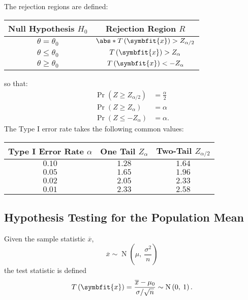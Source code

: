 \documentclass{article}
\begin{document}
The rejection regions are defined:
\begin{center}
    \begin{tabular}{cc}
        \toprule
        \textbf{Null Hypothesis} \(H_0\) & \textbf{Rejection Region} \(R\)                       \\
        \midrule
        \(\theta = \theta_0\)            & \(\abs*{T\left( \symbfit{x} \right)} > Z_{\alpha/2}\) \\
        \(\theta \leq \theta_0\)         & \(T\left( \symbfit{x} \right) > Z_{\alpha}\)          \\
        \(\theta \geq \theta_0\)         & \(T\left( \symbfit{x} \right) < -Z_{\alpha}\)         \\
        \bottomrule
    \end{tabular}
\end{center}
so that:
\begin{align*}
    \Pr{\left( Z \geq Z_{\alpha / 2} \right)} & = \frac{\alpha}{2} \\
    \Pr{\left( Z \geq Z_{\alpha} \right)}     & = \alpha           \\
    \Pr{\left( Z \leq -Z_{\alpha} \right)}    & = \alpha.
\end{align*}
The Type I error rate takes the following common values:
\begin{center}
    \begin{tabular}{ccc}
        \toprule
        \textbf{Type I Error Rate} \(\alpha\) & \textbf{One Tail} \(Z_{\alpha}\) & \textbf{Two-Tail} \(Z_{\alpha/2}\) \\
        \midrule
        \(0.10\)                              & \(1.28\)                         & \(1.64\)                           \\
        \(0.05\)                              & \(1.65\)                         & \(1.96\)                           \\
        \(0.02\)                              & \(2.05\)                         & \(2.33\)                           \\
        \(0.01\)                              & \(2.33\)                         & \(2.58\)                           \\
        \bottomrule
    \end{tabular}
\end{center}
\subsection{Hypothesis Testing for the Population Mean}
Given the sample statistic \(\overline{x}\),
\begin{equation*}
    \overline{x} \sim \operatorname{N}\left( \mu,\: \frac{\sigma^2}{n} \right)
\end{equation*}
the test statistic is defined
\begin{equation*}
    T\left( \symbfit{x} \right) = \frac{\overline{x} - \mu_0}{\sigma/\sqrt{n}} \sim \operatorname{N}\left( 0,\: 1 \right).
\end{equation*}
\end{document}

